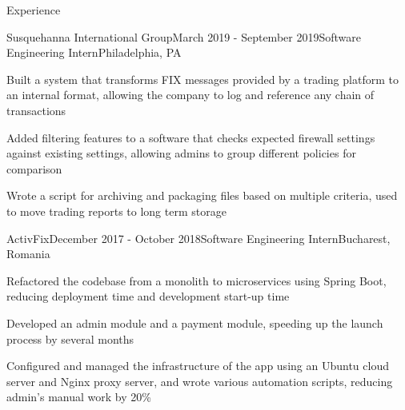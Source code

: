 \documentclass{resume} %
\begin{document}
\begin{rSection}{Experience}

\begin{rSubsection}{Susquehanna International Group}{March 2019 - September 2019}{Software Engineering Intern}{Philadelphia, PA}
\item Built a system that transforms FIX messages provided by a trading platform to an internal format, allowing the company to log and reference any chain of transactions
\item Added filtering features to a software that checks expected firewall settings against existing settings, allowing admins to group different policies for comparison
\item Wrote a script for archiving and packaging files based on multiple criteria, used to move trading reports to long term storage
\end{rSubsection}


\begin{rSubsection}{ActivFix}{December 2017 - October 2018}{Software Engineering Intern}{Bucharest, Romania}
\item Refactored the codebase from a monolith to microservices using Spring Boot, reducing deployment time and development start-up time
\item Developed an admin module and a payment module, speeding up the launch process by several months
\item Configured and managed the infrastructure of the app using an Ubuntu cloud server and Nginx proxy server, and wrote various automation scripts, reducing admin's manual work by 20\%
\end{rSubsection}

\end{rSection}

\end{document}
